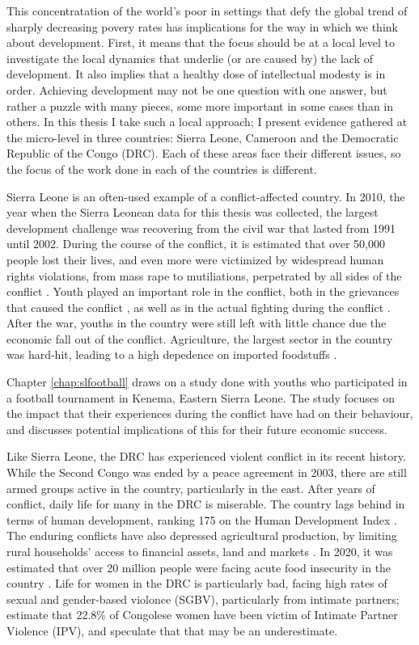 This concentratation of the world's poor in settings that defy the global trend of sharply decreasing povery rates has implications for the way in which we think about development. First, it means that the focus should be at a local level to investigate the local dynamics that underlie (or are caused by) the lack of development. It also implies that a healthy dose of intellectual modesty is in order. Achieving development may not be one question with one answer, but rather a puzzle with many pieces, some more important in some cases than in others. In this thesis I take such a local approach; I  present evidence gathered at the micro-level in three countries: Sierra Leone, Cameroon and the Democratic Republic of the Congo (DRC). Each of these areas face their different issues, so the focus of the work done in each of the countries is different.

Sierra Leone is an often-used example of a conflict-affected country. In 2010, the year when the Sierra Leonean data for this thesis was collected, the largest development challenge was recovering from the civil war that lasted from 1991 until 2002. During the course of the conflict, it is estimated that over 50,000 people lost their lives, and even more were victimized by widespread human rights violations, from mass rape to mutiliations, perpetrated by all sides of the conflict \citep{HumanRightsWatch1999a}. Youth played an important role in the conflict, both in the grievances that caused the conflict \citep[see e.g.][]{Peters1998,Richards2005,Peters2011}, as well as in the actual fighting during the conflict \citep{Humphreys2013}. After the war, youths in the country were still left with little chance due the economic fall out of the conflict.  Agriculture, the largest sector in the country was hard-hit, leading to a high depedence on imported foodstuffs \citep{FAO2005}. 

Chapter \ref{chap:slfootball} draws on a study done with youths who participated in a football tournament in Kenema, Eastern Sierra Leone. The study focuses on the impact that their experiences during the conflict have had on their behaviour, and discusses potential implications of this for their future economic success. 

Like Sierra Leone, the DRC has experienced violent conflict in its recent history. While the Second Congo was ended by a peace agreement in 2003, there are still armed groups active in the country, particularly in the east. After years of conflict, daily life for many in the DRC is miserable. The country lags behind in terms of human development, ranking 175 on the Human Development Index \citep{UNDP2020a}. The enduring conflicts have also depressed agricultural production, by limiting rural households' access to financial assets, land and markets \citep{Lecoutere2005, Vlassenroot}. In 2020, it was estimated that over 20 million people were facing acute food insecurity in the country \citep{FAO2020}. Life for women in the DRC is particularly bad, facing high rates of sexual and gender-based violonce (SGBV), particularly from intimate partners; \cite{Peterman2011} estimate that 22.8\% of Congolese women have been victim of Intimate Partner Violence (IPV), and speculate that that may be an underestimate.

